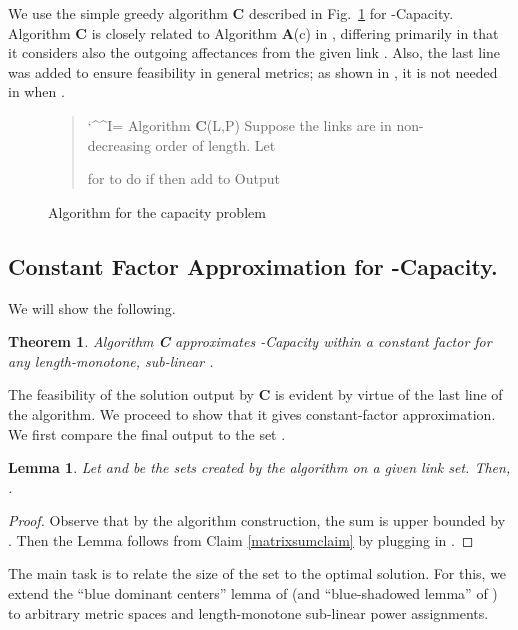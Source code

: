 \documentclass[11pt]{amsart}
\newcommand{\prob}[1]{\textsf{#1}}  \newcommand{\myparagraph}[1]{\smallskip\noindent\textbf{#1}\quad}
\newcommand{\alg}[1]{\textbf{#1}}
\newlength{\tablength}
\newlength{\spacelength}
\newcommand{\tabstar}{\hspace*{\tablength}}
\newcommand{\spacestar}{\hspace*{\spacelength}}
\def\obeytabs{\catcode`\^^I=\active}
{\obeytabs\global\let^^I=\tabstar}
{\obeyspaces\global\let =\spacestar}
\newenvironment{display}{\begingroup\obeylines\obeyspaces\obeytabs}{\endgroup}
\newenvironment{prog}{\begin{display}\parskip0pt\sf}{\end{display}}
\newenvironment{pseudo}{\begin{quote}\begin{prog}}{\end{prog}\end{quote}}
\newcounter{foo}
\newtheorem{theorem}[foo]{Theorem}
\newtheorem{lemma}[foo]{Lemma}
\begin{document}
We use the simple greedy algorithm \alg{C} described in Fig.~\ref{alg1fig}
for \prob{-Capacity}.
Algorithm \alg{C}
is closely related to
Algorithm \alg{A}(c) in \cite{HW09}, differing primarily in that
it considers also the outgoing affectances from the
given link . Also, the last line was added to ensure
feasibility in general metrics; as shown in \cite{HW09}, it is not
needed in  when .


\begin{figure}[htbp]
\begin{pseudo}
\textrm{Algorithm} \alg{C}(L,P)
     Suppose the links  
        are in non-decreasing order of length.  
     Let 
     
     for  to  do
        if 
           then add  to 
     Output 
\end{pseudo}
\caption{Algorithm for the capacity problem}
\label{alg1fig}
\end{figure}


\subsection{Constant Factor Approximation for \prob{-Capacity}.}
We will show the following.
\begin{theorem}
\label{consfactorthm}
Algorithm \alg{C} approximates \prob{-Capacity} within a constant factor for any
length-monotone, sub-linear .
\end{theorem}


The feasibility of the solution output by \alg{C} is evident by virtue of the last
line of the algorithm.
We proceed to show that it gives constant-factor approximation.
We first compare the final output to the set .

\begin{lemma}
Let  and  be the sets created by the algorithm  on a
given link set. Then, .
\label{lem:bound-on-x}
\end{lemma}

\begin{proof}
Observe that by the algorithm construction, the sum 
 is upper bounded by .
Then the Lemma follows from Claim \ref{matrixsumclaim} by plugging in .
\end{proof}

The main task is to relate the size of the set  to the optimal solution.
For this, we extend the ``blue dominant centers'' lemma of
\cite{GHWW09} (and ``blue-shadowed lemma'' of \cite{HW09}) to
arbitrary metric spaces and length-monotone sub-linear power assignments.  
\end{document}
